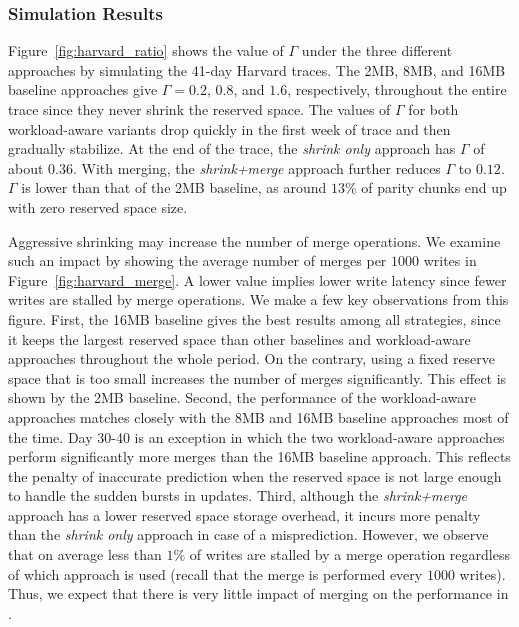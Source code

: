 
\subsubsection{Simulation Results} 

Figure~\ref{fig:harvard_ratio} shows the value
of $\Gamma$ under the three different approaches by simulating the 41-day
Harvard traces.  The 2MB, 8MB, and 16MB baseline approaches give 
$\Gamma=0.2$, $0.8$, and $1.6$, respectively, throughout the entire trace
since they never shrink the reserved space.  The values of $\Gamma$ for both
workload-aware variants drop quickly in the first week of trace and then
gradually stabilize.  At the end of the trace, the \textit{shrink only}
approach has $\Gamma$ of about $0.36$.  With merging, the
\textit{shrink+merge} approach further reduces $\Gamma$ to $0.12$. $\Gamma$ is
lower than that of the 2MB baseline, as around $13\%$ of parity chunks end up
with zero reserved space size.

Aggressive shrinking may increase the number of merge
operations. We examine such an impact by showing the average number of merges
per $1000$ writes in Figure~\ref{fig:harvard_merge}. A lower value implies lower
write latency since fewer writes are stalled by merge operations.  We make a
few key observations from this figure. First, the 16MB baseline gives the
best results among all strategies, since it keeps the largest reserved space
than other baselines and workload-aware approaches throughout the whole
period. On the contrary, using a fixed reserve space that is too small
increases the number of merges significantly. This effect is shown by the 2MB
baseline. Second, the performance of the workload-aware approaches matches
closely with the 8MB and 16MB baseline approaches most of the time.  Day 30-40
is an exception in which the two workload-aware approaches perform
significantly more merges than the 16MB baseline approach. This reflects
the penalty of inaccurate prediction when the reserved space is not large
enough to handle the sudden bursts in updates.  Third, although the
\textit{shrink+merge} approach has a lower reserved space storage overhead, it
incurs more penalty than the \textit{shrink only} approach in case of a
misprediction. However, we observe that on average less than $1\%$ of writes
are stalled by a merge operation regardless of which approach is used (recall
that the merge is performed every $1000$ writes).  Thus, we expect that there
is very little impact of merging on the performance in \PLR.

